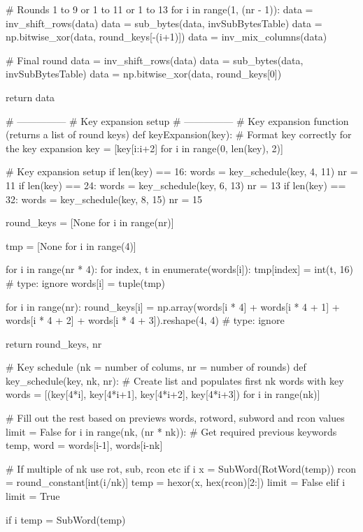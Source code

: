 \begin{python}
    # Rounds 1 to 9 or 1 to 11 or 1 to 13
    for i in range(1, (nr - 1)):
        data = inv_shift_rows(data)
        data = sub_bytes(data, invSubBytesTable)
        data = np.bitwise_xor(data, round_keys[-(i+1)])
        data = inv_mix_columns(data)

    # Final round
    data = inv_shift_rows(data)
    data = sub_bytes(data, invSubBytesTable)
    data = np.bitwise_xor(data, round_keys[0])

    return data


# ---------------
# Key expansion setup
# ---------------
# Key expansion function (returns a list of round keys)
def keyExpansion(key):
    # Format key correctly for the key expansion
    key = [key[i:i+2] for i in range(0, len(key), 2)]

    # Key expansion setup
    if len(key) == 16:
        words = key_schedule(key, 4, 11)
        nr = 11
    if len(key) == 24:
        words = key_schedule(key, 6, 13)
        nr = 13
    if len(key) == 32:
        words = key_schedule(key, 8, 15)
        nr = 15

    round_keys = [None for i in range(nr)]

    tmp = [None for i in range(4)]

    for i in range(nr * 4):
        for index, t in enumerate(words[i]):
            tmp[index] = int(t, 16)  # type: ignore
        words[i] = tuple(tmp)

    for i in range(nr):
        round_keys[i] = np.array(words[i * 4] + words[i * 4 + 1] + words[i * 4 + 2] + words[i * 4 + 3]).reshape(4, 4)  # type: ignore

    return round_keys, nr


# Key schedule (nk = number of colums, nr = number of rounds)
def key_schedule(key, nk, nr):
    # Create list and populates first nk words with key
    words = [(key[4*i], key[4*i+1], key[4*i+2], key[4*i+3]) for i in range(nk)]

    # Fill out the rest based on previews words, rotword, subword and rcon values
    limit = False
    for i in range(nk, (nr * nk)):
        # Get required previous keywords
        temp, word = words[i-1], words[i-nk]

        # If multiple of nk use rot, sub, rcon etc
        if i %
            x = SubWord(RotWord(temp))
            rcon = round_constant[int(i/nk)]
            temp = hexor(x, hex(rcon)[2:])
            limit = False
        elif i %
            limit = True

        if i %
            temp = SubWord(temp)


\end{python}
